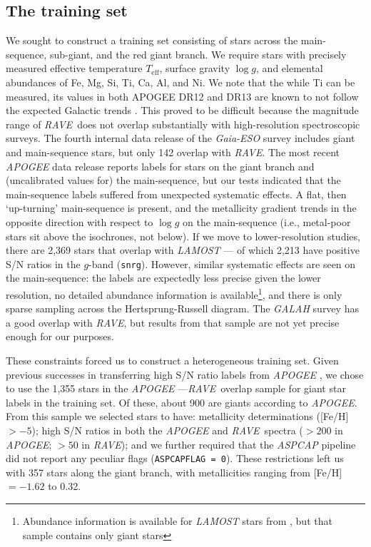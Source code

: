 \documentclass[preprint,trackchanges]{aastex}
\newcommand{\project}[1]{\textsl{#1}}
\newcommand{\rave}{\project{\acronym{RAVE}}}
\newcommand{\acronym}[1]{{\small{#1}}}
\newcommand{\teff}{T_{\mathrm{eff}}}
\newcommand{\logg}{\log g}
\begin{document}
\subsection{The training set}
\label{sec:the-training-set}

We sought to construct a training set consisting of stars across the main-sequence,
sub-giant, and the red giant branch.  We require stars with precisely measured
effective temperature $\teff$, surface gravity $\logg$, and elemental abundances
of Fe, Mg, Si, Ti, Ca, Al, and Ni. We note that the while Ti can be measured, its values in both 
APOGEE DR12 and DR13 are known to not follow the expected Galactic trends \citep{Holtzman_2015, Hawkins_2016}.
This proved to be difficult because the magnitude
range of \rave\ does not overlap substantially with high-resolution spectroscopic
surveys.  The fourth internal data release of the \project{Gaia-ESO} survey includes 
giant and main-sequence stars, but only 142 overlap with \rave.  The most recent 
\project{APOGEE} data release \citep{sloan_dr13} reports labels for stars on the
giant branch and (uncalibrated values for) the main-sequence, but our tests indicated
that the main-sequence labels suffered from unexpected systematic effects.  A flat, 
then `up-turning' main-sequence is present, and the metallicity gradient trends in 
the opposite direction with respect to $\logg$ on the main-sequence (i.e., metal-poor
stars sit above the isochrones, not below).  If we move to lower-resolution studies,
there are 2,369 stars that overlap with \project{LAMOST} --- of which 2,213 have positive
S/N ratios in the $g$-band (\texttt{snrg}).  However, similar systematic effects are 
seen on the main-sequence: the labels are expectedly less precise given the lower
resolution, no detailed abundance information is available\footnote{Abundance 
information is available for \project{LAMOST} stars from \citet{Ho_2016}, but that 
sample contains only giant stars}, and there is only sparse sampling across the 
Hertsprung-Russell diagram.  The \project{GALAH} survey has a good overlap with \rave,
but results from that sample are not yet precise enough for our purposes.


These constraints forced us to construct a heterogeneous training set.  Given previous
successes in transferring high S/N ratio labels from \project{APOGEE} \citep{Ness_2015,
Ness_2016,Ho_2016,Casey_2016b}, we chose to use the 1,355 stars in the \project{APOGEE}
---\rave\ overlap sample for giant star labels in the training set.  Of these, about
900 are giants according to \project{APOGEE}.  From this sample we selected stars to
have: metallicity determinations ([Fe/H] $> -5$); high S/N ratios in both the 
\project{APOGEE} and \rave\ spectra ($>200$ in \project{APOGEE}; $>50$ in \rave); and
we further required that the \project{ASPCAP} pipeline did not report any peculiar
flags (\texttt{ASPCAPFLAG = 0}).  These restrictions left us with 357 stars along the
giant branch, with metallicities ranging from [Fe/H] $= -1.62$ to 0.32.
\end{document}
